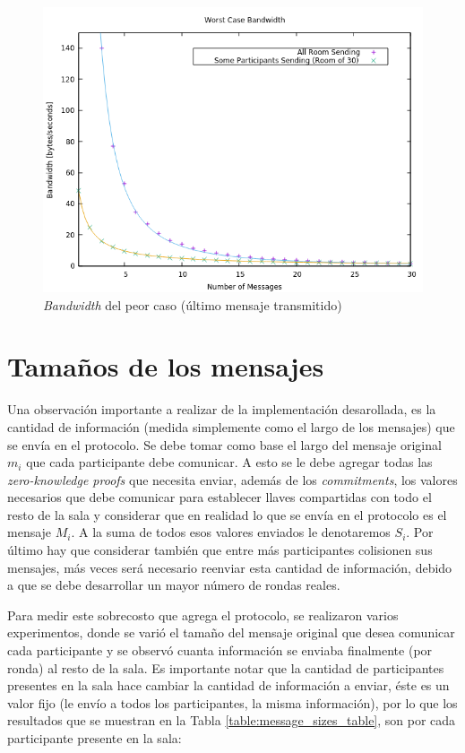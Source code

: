\begin{figure}[H]
  \centering
    \includegraphics[scale=0.7]{logs/bandwidth.png}
  \caption{\emph{Bandwidth} del peor caso (último mensaje transmitido)}
  \label{fig:times-variable}
\end{figure}

\section{Tamaños de los mensajes}

Una observación importante a realizar de la implementación desarollada, es la 
cantidad de información (medida simplemente como el largo de los mensajes) que 
se envía en el protocolo. Se debe tomar como base el largo del mensaje 
original $m_i$ que cada participante debe comunicar. A esto se le debe agregar 
todas las \emph{zero-knowledge proofs} que necesita enviar, además de los \emph
{commitments}, los valores necesarios que debe comunicar para establecer 
llaves compartidas con todo el resto de la sala y considerar que en realidad 
lo que se envía en el protocolo es el mensaje $M_i$. A la suma de todos esos 
valores enviados le denotaremos $S_i$. Por último hay que considerar también 
que entre más participantes colisionen sus mensajes, más veces será necesario 
reenviar esta cantidad de información, debido a que se debe desarrollar un 
mayor número de rondas reales.

Para medir este sobrecosto que agrega el protocolo, se realizaron varios 
experimentos, donde se varió el tamaño del mensaje original que desea 
comunicar cada participante y se observó cuanta información se enviaba 
finalmente (por ronda) al resto de la sala. Es importante notar que la cantidad 
de participantes presentes en la sala hace cambiar la cantidad de información a 
enviar, éste es un valor fijo (le envío a todos los participantes, la misma 
información), por lo que los resultados que se muestran en la Tabla \ref{table:message_sizes_table}, 
son por cada participante presente en la sala:

